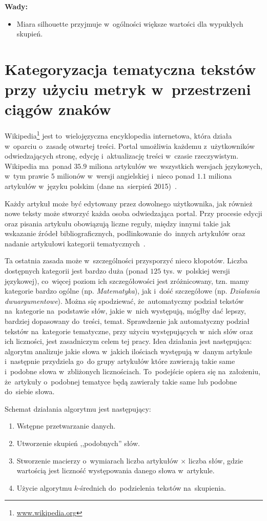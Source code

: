 \documentclass{praca1}
\begin{document}
\textbf{Wady:}
\begin{itemize}
\item Miara silhouette przyjmuje w~ogólności większe wartości dla wypukłych skupień.
\end{itemize}


\chapter{Kategoryzacja tematyczna tekstów przy użyciu metryk w~przestrzeni ciągów znaków}

Wikipedia\footnote{\url{www.wikipedia.org}} jest to~wielojęzyczna encyklopedia internetowa, która działa w~oparciu o~zasadę otwartej treści. Portal umożliwia każdemu z~użytkowników odwiedzających stronę, edycję i~aktualizację treści w~czasie rzeczywistym. Wikipedia ma~ponad $35.9$ miliona artykułów we~wszystkich wersjach językowych, w~tym prawie $5$ milionów w~wersji angielskiej i~nieco ponad $1.1$ miliona artykułów w~języku polskim (dane na~sierpień 2015)~\cite{wiki}.

Każdy artykuł może być edytowany przez dowolnego użytkownika, jak również nowe teksty może stworzyć każda osoba odwiedzająca portal. Przy procesie edycji oraz pisania artykułu obowiązują liczne reguły, między innymi takie jak wskazanie źródeł bibliograficznych, podlinkowanie do~innych artykułów oraz nadanie artykułowi kategorii tematycznych~\cite{wiki}. 

Ta ostatnia zasada może w~szczególności przysporzyć nieco kłopotów. Liczba dostępnych kategorii jest bardzo duża (ponad $125$ tys. w~polskiej wersji językowej), co~więcej poziom ich szczegółowości jest zróżnicowany, tzn. mamy kategorie bardzo ogólne (np. \emph{Matematyka}), jak i~dość szczegółowe (np. \emph{Działania dwuargumentowe}). Można się spodziewać, że~automatyczny podział tekstów na~kategorie na~podstawie słów, jakie w~nich występują, mógłby dać lepszy, bardziej dopasowany do~treści, temat. Sprawdzenie jak automatyczny podział tekstów na~kategorie tematyczne, przy użyciu występujących w~nich słów oraz ich liczności, jest zasadniczym celem tej pracy. Idea działania jest następująca: algorytm analizuje jakie słowa w~jakich ilościach występują w~danym artykule i~następnie przydziela go~do grupy artykułów które zawierają takie same i~podobne słowa w~zbliżonych licznościach. To~podejście opiera się na~założeniu, że~artykuły o~podobnej tematyce będą zawierały takie same lub podobne do~siebie słowa. 

Schemat działania algorytmu jest następujący:
\begin{enumerate}
\item Wstępne przetwarzanie danych.
\item Utworzenie skupień ,,podobnych'' słów.
\item Stworzenie macierzy o~wymiarach liczba artykułów $\times$ liczba słów, gdzie wartością jest liczność występowania danego słowa w~artykule.
\item Użycie algorytmu $k$-średnich do~podzielenia tekstów na~skupienia.
\end{enumerate}
\end{document}
